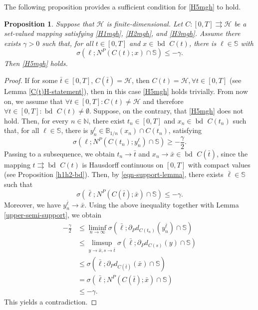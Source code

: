 \documentclass[preprint,12pt]{elsarticle}
\renewcommand{\H}{\mathcal{H}}
\newcommand{\N}{\mathbb{N}}
\newcommand{\tto}{\rightrightarrows}
\newcommand{\bd}{{\operatorname{bd \ }}}
\theoremstyle{plain}
\newtheorem{proposition}[theorem]{Proposition}
\theoremstyle{definition}
\theoremstyle{remark}
\begin{document}
    
The following proposition provides a sufficient condition for \ref{H5mgh} to hold.
\begin{proposition}\label{lemma-H5-suficiente}
    Suppose that $\H$  is finite-dimensional. Let $C\colon [0,T]\tto \H$ be a set-valued mapping  satisfying \ref{H1mgh}, \ref{H2mgh}, and \ref{H3mgh}. Assume there exists $\gamma>0$ such that, for all $t\in [0,T]$ and $x\in \bd C(t)$, there is $\ell\in \mathbb{S}$ with
    \begin{equation}\label{eqn-support-lemma}
        \sigma(\ell;N^P(C(t);x)\cap \mathbb{S})\leq -\gamma.
    \end{equation}
    Then \ref{H5mgh} holds.
\end{proposition}
\begin{proof}
If for some $\bar t\in [0,T]$, $C(\bar t) = \H$, then $C(t) = \H, \forall t\in [0,T]$ (see Lemma \ref{C(t)H-statement}), then in this case \ref{H5mgh} holds trivially. From now on, we assume that $\forall t\in [0,T] : C(t)\neq \H$ and therefore $\forall t\in [0,T] : \bd C(t)\neq \emptyset$. Suppose, on the contrary, that \ref{H5mgh} does not hold. Then, for every $n\in\N$, there exist $t_n\in [0,T]$ and $x_n\in \bd C(t_n)$ such that, for all $\ell\in \mathbb{S}$, there is $y_n^{\ell}\in \mathbb{B}_{1/n}(x_n)\cap C(t_n)$, satisfying
		\begin{equation*}
\sigma(\ell;N^P(C(t_n);y_n^{\ell})\cap\mathbb{S})\geq -\frac{\gamma}{2}.
		\end{equation*}
Passing to a subsequence, we obtain $t_n\to \bar t$ and $x_n\to \bar x\in \bd C(\bar t)$, since the mapping $t\tto \bd C(t)$ is Hausdorff continuous on $[0,T]$ with compact values (see Proposition \ref{h1h2-bd}). Then, by \eqref{eqn-support-lemma}, there exists $\bar\ell\in \mathbb{S}$ such that 
		\begin{equation*}
			\sigma(\bar\ell;N^P(C(\bar t);\bar x)\cap\mathbb{S})\leq -\gamma.    
		\end{equation*} 
Moreover, we have  $y_n^{\bar\ell}\to \bar x$. Using the  above inequality together with Lemma \ref{upper-semi-support}, we obtain 
		\begin{align*}
				-\frac{\gamma}{2} &\leq \liminf_{n\to\infty}\sigma(\bar\ell; \partial_P d_{C(t_n)}(y_n^{\bar \ell})\cap\mathbb{S})\\
				&\leq \limsup_{y\to \bar x, s\to \bar t} \sigma(\bar\ell;\partial_P d_{C(s)}(y)\cap \mathbb{S})\\
				&\leq \sigma(\bar\ell;\partial_P d_{C(\bar t)}(\bar x)\cap\mathbb{S})\\
                &= \sigma(\bar\ell;N^P(C(\bar t);\bar x)\cap\mathbb{S})\\
                &\leq -\gamma.
		\end{align*} 
        This yields a contradiction.
\end{proof}
\end{document}
